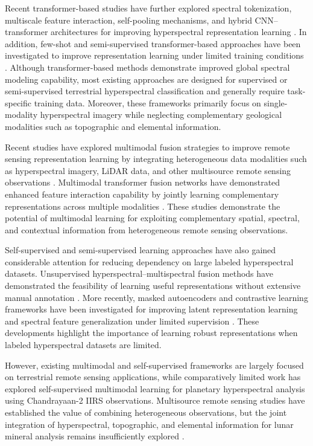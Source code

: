 \documentclass[pdflatex,sn-mathphys-num]{sn-jnl}
\begin{document}
Recent transformer-based studies have further explored spectral tokenization, multiscale feature interaction, self-pooling mechanisms, and hybrid CNN--transformer architectures for improving hyperspectral representation learning \cite{ref20,ref21}. In addition, few-shot and semi-supervised transformer-based approaches have been investigated to improve representation learning under limited training conditions \cite{ref20,ref37}. Although transformer-based methods demonstrate improved global spectral modeling capability, most existing approaches are designed for supervised or semi-supervised terrestrial hyperspectral classification and generally require task-specific training data. Moreover, these frameworks primarily focus on single-modality hyperspectral imagery while neglecting complementary geological modalities such as topographic and elemental information.


Recent studies have explored multimodal fusion strategies to improve remote sensing representation learning by integrating heterogeneous data modalities such as hyperspectral imagery, LiDAR data, and other multisource remote sensing observations \cite{ref5,ref7,ref51,ref52}. Multimodal transformer fusion networks have demonstrated enhanced feature interaction capability by jointly learning complementary representations across multiple modalities \cite{ref6,ref29}. These studies demonstrate the potential of multimodal learning for exploiting complementary spatial, spectral, and contextual information from heterogeneous remote sensing observations.

Self-supervised and semi-supervised learning approaches have also gained considerable attention for reducing dependency on large labeled hyperspectral datasets. Unsupervised hyperspectral--multispectral fusion methods have demonstrated the feasibility of learning useful representations without extensive manual annotation \cite{ref15,ref22}. More recently, masked autoencoders and contrastive learning frameworks have been investigated for improving latent representation learning and spectral feature generalization under limited supervision \cite{ref34,ref37}. These developments highlight the importance of learning robust representations when labeled hyperspectral datasets are limited.

However, existing multimodal and self-supervised frameworks are largely focused on terrestrial remote sensing applications, while comparatively limited work has explored self-supervised multimodal learning for planetary hyperspectral analysis using Chandrayaan-2 IIRS observations. Multisource remote sensing studies have established the value of combining heterogeneous observations, but the joint integration of hyperspectral, topographic, and elemental information for lunar mineral analysis remains insufficiently explored \cite{ref51,ref52}.
\end{document}
